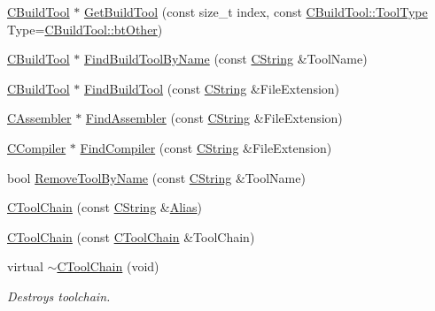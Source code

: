 \begin{DoxyCompactItemize}
\item 
\hyperlink{classCBuildTool}{C\-Build\-Tool} $\ast$ \hyperlink{classCToolChain_a9f391198b3f31a501021525a41b2c944}{Get\-Build\-Tool} (const size\-\_\-t index, const \hyperlink{classCBuildTool_a1a622843617ddf9b0ebb1c09c3437e6d}{C\-Build\-Tool\-::\-Tool\-Type} Type=\hyperlink{classCBuildTool_a1a622843617ddf9b0ebb1c09c3437e6dab1bafc4d8b635a113d8aa8df402db376}{C\-Build\-Tool\-::bt\-Other})
\item 
\hyperlink{classCBuildTool}{C\-Build\-Tool} $\ast$ \hyperlink{classCToolChain_a2e7a34d130a32c3eb6db21200235bc1b}{Find\-Build\-Tool\-By\-Name} (const \hyperlink{classCString}{C\-String} \&Tool\-Name)
\item 
\hyperlink{classCBuildTool}{C\-Build\-Tool} $\ast$ \hyperlink{classCToolChain_aec2ff2acf6ec411df7795611778b85bb}{Find\-Build\-Tool} (const \hyperlink{classCString}{C\-String} \&File\-Extension)
\item 
\hyperlink{classCAssembler}{C\-Assembler} $\ast$ \hyperlink{classCToolChain_a314020139dad9011c865fb13d7204c00}{Find\-Assembler} (const \hyperlink{classCString}{C\-String} \&File\-Extension)
\item 
\hyperlink{classCCompiler}{C\-Compiler} $\ast$ \hyperlink{classCToolChain_ae8fa3698c5800900e7d18eafd5db2c96}{Find\-Compiler} (const \hyperlink{classCString}{C\-String} \&File\-Extension)
\item 
bool \hyperlink{classCToolChain_a6342cf88cd592baf106b35120d6fc38d}{Remove\-Tool\-By\-Name} (const \hyperlink{classCString}{C\-String} \&Tool\-Name)
\item 
\hyperlink{classCToolChain_aaf2bebe7f6d5e60d7fad029886d401b2}{C\-Tool\-Chain} (const \hyperlink{classCString}{C\-String} \&\hyperlink{classCToolChain_a81b15f66df2066155de40f6fb975a613}{Alias})
\item 
\hyperlink{classCToolChain_ac479aa7f0a485f023e711f5362354531}{C\-Tool\-Chain} (const \hyperlink{classCToolChain}{C\-Tool\-Chain} \&Tool\-Chain)
\item 
virtual \hyperlink{classCToolChain_ac2e68e41307160ce099ccc9b993fdb97}{$\sim$\-C\-Tool\-Chain} (void)
\begin{DoxyCompactList}\small\item\em Destroys toolchain. \end{DoxyCompactList}\end{DoxyCompactItemize}

